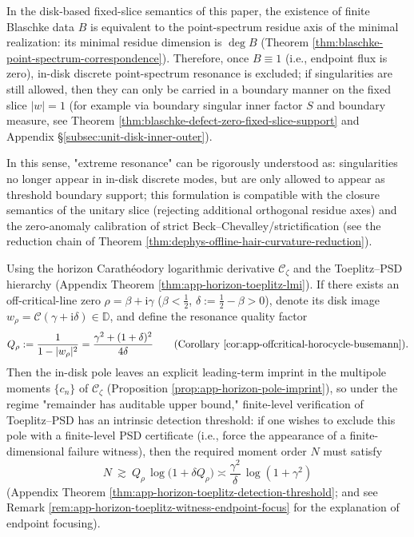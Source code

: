 \begin{remark}\label{rem:xi-threshold-carrying-extreme-resonance}
In the disk-based fixed-slice semantics of this paper, the existence of finite Blaschke data \(B\) is equivalent to the point-spectrum residue axis of the minimal realization: its minimal residue dimension is \(\deg B\) (Theorem \ref{thm:blaschke-point-spectrum-correspondence}).
Therefore, once \(B\equiv 1\) (i.e., endpoint flux is zero), in-disk discrete point-spectrum resonance is excluded;
if singularities are still allowed, then they can only be carried in a boundary manner on the fixed slice \(|w|=1\) (for example via boundary singular inner factor \(S\) and boundary measure, see Theorem \ref{thm:blaschke-defect-zero-fixed-slice-support} and Appendix \S\ref{subsec:unit-disk-inner-outer}).
\par
In this sense, "extreme resonance" can be rigorously understood as: singularities no longer appear in in-disk discrete modes, but are only allowed to appear as threshold boundary support;
this formulation is compatible with the closure semantics of the unitary slice (rejecting additional orthogonal residue axes) and the zero-anomaly calibration of strict Beck--Chevalley/strictification (see the reduction chain of Theorem \ref{thm:dephys-offline-hair-curvature-reduction}).
\end{remark}

\begin{proposition}\label{prop:xi-extreme-resonance-toeplitz-threshold}
Using the horizon Carath\'eodory logarithmic derivative \(\mathscr{C}_{\zeta}\) and the Toeplitz--PSD hierarchy (Appendix Theorem \ref{thm:app-horizon-toeplitz-lmi}).
If there exists an off-critical-line zero \(\rho=\beta+\mathrm{i}\gamma\) (\(\beta<\tfrac12\), \(\delta:=\tfrac12-\beta>0\)), denote its disk image \(w_\rho=\mathcal{C}(\gamma+\mathrm{i}\delta)\in\mathbb{D}\), and define the resonance quality factor
\[
Q_\rho:=\frac{1}{1-|w_\rho|^2}=\frac{\gamma^2+(1+\delta)^2}{4\delta}
\qquad\text{(Corollary \ref{cor:app-offcritical-horocycle-busemann})}.
\]
Then the in-disk pole leaves an explicit leading-term imprint in the multipole moments \(\{c_n\}\) of \(\mathscr{C}_{\zeta}\) (Proposition \ref{prop:app-horizon-pole-imprint}), so under the regime "remainder has auditable upper bound," finite-level verification of Toeplitz--PSD has an intrinsic detection threshold: if one wishes to exclude this pole with a finite-level PSD certificate (i.e., force the appearance of a finite-dimensional failure witness), then the required moment order \(N\) must satisfy
\[
N\ \gtrsim\ Q_\rho\,\log\!\bigl(1+\delta Q_\rho\bigr)
\asymp \frac{\gamma^2}{\delta}\,\log(1+\gamma^2)
\]
(Appendix Theorem \ref{thm:app-horizon-toeplitz-detection-threshold}; and see Remark \ref{rem:app-horizon-toeplitz-witness-endpoint-focus} for the explanation of endpoint focusing).
\end{proposition}

